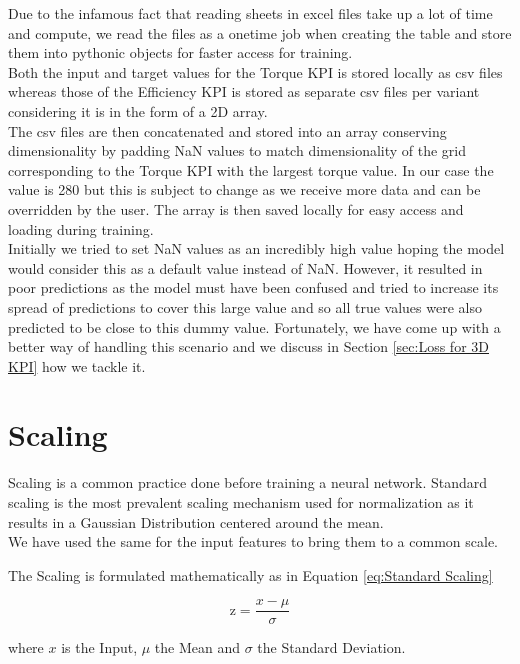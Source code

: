 \documentclass{report} %
\begin{document}
Due to the infamous fact that reading sheets in excel files take up a lot of time and compute, we read the files as a onetime job when creating the table and store them into pythonic objects for faster access for training.\\
Both the input and target values for the Torque \ac{KPI} is stored locally as csv files whereas those of the Efficiency \ac{KPI} is stored as separate csv files per variant considering it is in the form of a 2\ac{D} array.\\
The csv files are then concatenated and stored into an array conserving dimensionality by padding \ac{NaN} values to match dimensionality of the grid corresponding to the Torque \ac{KPI} with the largest torque value.
In our case the value is 280 but this is subject to change as we receive more data and can be overridden by the user.
The array is then saved locally for easy access and loading during training.\\

Initially we tried to set \ac{NaN} values as an incredibly high value hoping the model would consider this as a default value instead of \ac{NaN}.
However, it resulted in poor predictions as the model must have been confused and tried to increase its spread of predictions to cover this large value and so all true values were also predicted to be close to this dummy value.
Fortunately, we have come up with a better way of handling this scenario and we discuss in Section \ref{sec:Loss for 3D KPI} how we tackle it.

\section{Scaling}\label{sec:Scaling}

Scaling is a common practice done before training a neural network. 
Standard scaling is the most prevalent scaling mechanism used for normalization as it results in a Gaussian Distribution centered around the mean. \\
We have used the same for the input features to bring them to a common scale. 

The Scaling is formulated mathematically as in Equation \ref{eq:Standard Scaling}

\begin{equation}
    \text{z} = \frac{x - \mu}{\sigma}
    \label{eq:Standard Scaling}
\end{equation} 

where $x$ is the Input, $\mu$ the Mean and $\sigma$ the Standard Deviation.
\end{document}
